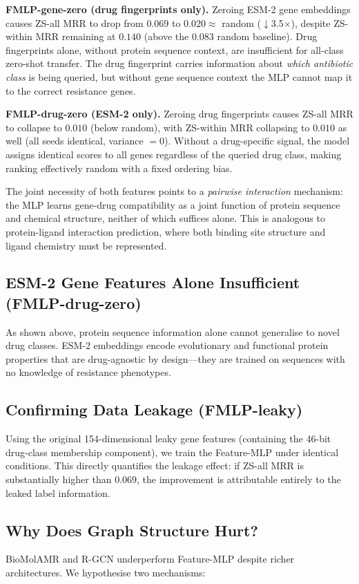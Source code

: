 \documentclass[conference]{IEEEtran}
\begin{document}
\textbf{FMLP-gene-zero (drug fingerprints only).}
Zeroing ESM-2 gene embeddings causes ZS-all MRR to drop from $0.069$ to
$0.020 \approx $ random ($\downarrow$3.5$\times$), despite ZS-within MRR
remaining at $0.140$ (above the $0.083$ random baseline).
Drug fingerprints alone, without protein sequence context, are insufficient for
all-class zero-shot transfer. The drug fingerprint carries information about
\emph{which antibiotic class} is being queried, but without gene sequence
context the MLP cannot map it to the correct resistance genes.

\textbf{FMLP-drug-zero (ESM-2 only).}
Zeroing drug fingerprints causes ZS-all MRR to collapse to $0.010$ (below
random), with ZS-within MRR collapsing to $0.010$ as well (all seeds identical,
variance $= 0$). Without a drug-specific signal, the model assigns identical
scores to all genes regardless of the queried drug class, making ranking
effectively random with a fixed ordering bias.

The joint necessity of both features points to a \emph{pairwise interaction}
mechanism: the MLP learns gene-drug compatibility as a joint function of protein
sequence and chemical structure, neither of which suffices alone. This is
analogous to protein-ligand interaction prediction, where both binding site
structure and ligand chemistry must be represented.

\subsection{ESM-2 Gene Features Alone Insufficient (FMLP-drug-zero)}
As shown above, protein sequence information alone cannot generalise to novel
drug classes. ESM-2 embeddings encode evolutionary and functional protein
properties that are drug-agnostic by design---they are trained on sequences with
no knowledge of resistance phenotypes.

\subsection{Confirming Data Leakage (FMLP-leaky)}
Using the original 154-dimensional leaky gene features (containing the 46-bit
drug-class membership component), we train the Feature-MLP under identical
conditions. This directly quantifies the leakage effect: if ZS-all MRR is
substantially higher than $0.069$, the improvement is attributable entirely
to the leaked label information.

\subsection{Why Does Graph Structure Hurt?}
BioMolAMR and R-GCN underperform Feature-MLP despite richer architectures.
We hypothesise two mechanisms:
\end{document}
